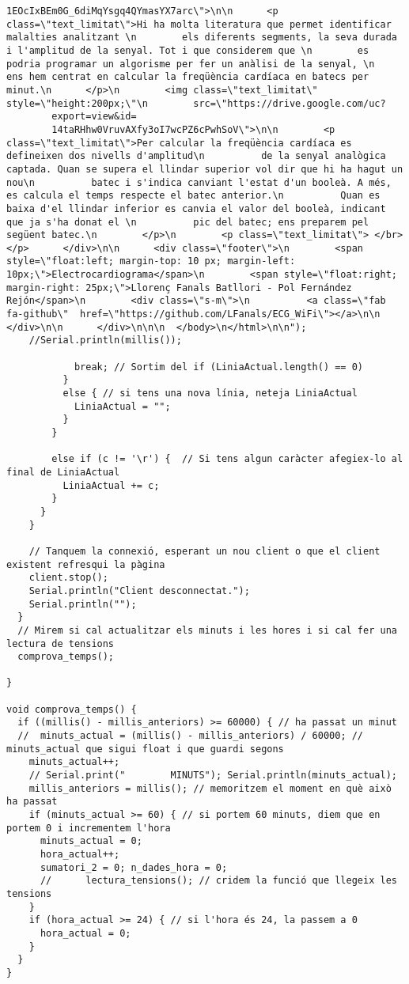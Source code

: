 \begin{lstlisting}[style=myArduino]
        1EOcIxBEm0G_6diMqYsgq4QYmasYX7arc\">\n\n      <p class=\"text_limitat\">Hi ha molta literatura que permet identificar malalties analitzant \n        els diferents segments, la seva durada i l'amplitud de la senyal. Tot i que considerem que \n        es podria programar un algorisme per fer un anàlisi de la senyal, \n        ens hem centrat en calcular la freqüència cardíaca en batecs per minut.\n      </p>\n        <img class=\"text_limitat\" style=\"height:200px;\"\n        src=\"https://drive.google.com/uc?
        export=view&id=
        14taRHhw0VruvAXfy3oI7wcPZ6cPwhSoV\">\n\n        <p class=\"text_limitat\">Per calcular la freqüència cardíaca es defineixen dos nivells d'amplitud\n          de la senyal analògica captada. Quan se supera el llindar superior vol dir que hi ha hagut un nou\n          batec i s'indica canviant l'estat d'un booleà. A més, es calcula el temps respecte el batec anterior.\n          Quan es baixa d'el llindar inferior es canvia el valor del booleà, indicant que ja s'ha donat el \n          pic del batec; ens preparem pel següent batec.\n        </p>\n        <p class=\"text_limitat\"> </br></p>      </div>\n\n      <div class=\"footer\">\n        <span style=\"float:left; margin-top: 10 px; margin-left: 10px;\">Electrocardiograma</span>\n        <span style=\"float:right; margin-right: 25px;\">Llorenç Fanals Batllori - Pol Fernández Rejón</span>\n        <div class=\"s-m\">\n          <a class=\"fab fa-github\"  href=\"https://github.com/LFanals/ECG_WiFi\"></a>\n\n        </div>\n\n      </div>\n\n\n  </body>\n</html>\n\n");
    //Serial.println(millis());
    
            break; // Sortim del if (LiniaActual.length() == 0) 
          }
          else { // si tens una nova línia, neteja LiniaActual
            LiniaActual = "";
          }
        }

        else if (c != '\r') {  // Si tens algun caràcter afegiex-lo al final de LiniaActual
          LiniaActual += c;
        }
      }
    }

    // Tanquem la connexió, esperant un nou client o que el client existent refresqui la pàgina
    client.stop();
    Serial.println("Client desconnectat.");
    Serial.println("");
  }
  // Mirem si cal actualitzar els minuts i les hores i si cal fer una lectura de tensions
  comprova_temps();
 
}

void comprova_temps() {
  if ((millis() - millis_anteriors) >= 60000) { // ha passat un minut
  //  minuts_actual = (millis() - millis_anteriors) / 60000; // minuts_actual que sigui float i que guardi segons
    minuts_actual++; 
    // Serial.print("        MINUTS"); Serial.println(minuts_actual);
    millis_anteriors = millis(); // memoritzem el moment en què això ha passat
    if (minuts_actual >= 60) { // si portem 60 minuts, diem que en portem 0 i incrementem l'hora
      minuts_actual = 0;
      hora_actual++;
      sumatori_2 = 0; n_dades_hora = 0;
      //      lectura_tensions(); // cridem la funció que llegeix les tensions
    }
    if (hora_actual >= 24) { // si l'hora és 24, la passem a 0
      hora_actual = 0;
    }
  }
}
\end{lstlisting}




